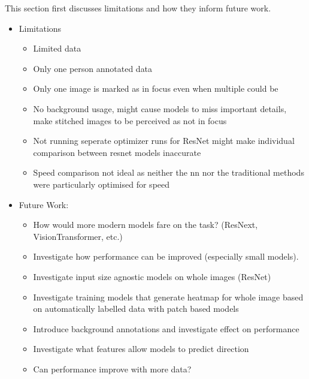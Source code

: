 This section first discusses limitations and how they inform future work.

\begin{itemize}
    \item Limitations
    \begin{itemize}
        \item Limited data
        \item Only one person annotated data
        \item Only one image is marked as in focus even when multiple could be
        \item No background usage, might cause models to miss important details, make stitched images to be perceived as not in focus
        \item Not running seperate optimizer runs for ResNet might make individual comparison between resnet models inaccurate
        \item Speed comparison not ideal as neither the nn nor the traditional methods were particularly optimised for speed
    \end{itemize}
\end{itemize}

\begin{itemize}
    \item Future Work:
    \begin{itemize}
        \item How would more modern models fare on the task? (ResNext, VisionTransformer, etc.)
        \item Investigate how performance can be improved (especially small models).
        \item Investigate input size agnostic models on whole images (ResNet)
        \item Investigate training models that generate heatmap for whole image based on automatically labelled data with patch based models
        \item Introduce background annotations and investigate effect on performance
        \item Investigate what features allow models to predict direction
        \item Can performance improve with more data?
    \end{itemize}
\end{itemize}
